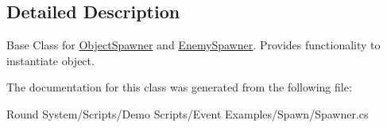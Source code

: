 \subsection{Detailed Description}
Base Class for \hyperlink{class_round_manager_1_1_object_spawner}{Object\+Spawner} and \hyperlink{class_round_manager_1_1_enemy_spawner}{Enemy\+Spawner}. Provides functionality to instantiate object. 



The documentation for this class was generated from the following file\+:\begin{DoxyCompactItemize}
\item 
Round System/\+Scripts/\+Demo Scripts/\+Event Examples/\+Spawn/Spawner.\+cs\end{DoxyCompactItemize}
